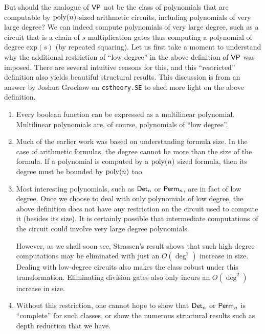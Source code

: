 But should the analogue of $\mathsf{VP}$ not be the class of polynomials that are computable by $\operatorname{poly}(n)$-sized arithmetic
circuits, including polynomials of very large degree?
We can indeed compute polynomials of very large degree, such as a circuit that is a chain of $s$ multiplication gates thus computing a polynomial of degree $\mathrm{exp}(s)$ (by repeated squaring). 
Let us first take a moment to understand why the additional restriction of ``low-degree'' in the above definition of $\mathsf{VP}$ was imposed. 
There are several intuitive reasons for this, and this ``restricted'' definition also yields beautiful structural results. 
This discussion is from an answer by Joshua Grochow on \texttt{cstheory.SE} \cite{gro:SE} to shed more light on the above definition. 

\begin{enumerate}

\item Every boolean function can be expressed as a multilinear polynomial. 
Multilinear polynomials are, of course, polynomials of ``low degree''. 

\item Much of the earlier work was based on understanding formula size. 
In the case of arithmetic formulas, the degree cannot be more than the size of the formula. 
If a polynomial is computed by a $\operatorname{poly}(n)$ sized formula, then its degree must be bounded by $\operatorname{poly}(n)$ too. 

\item Most interesting polynomials, such as $\operatorname{\mathsf{Det}}_n$ or $\operatorname{\mathsf{Perm}}_n$, are in fact of low degree. 
Once we choose to deal with only polynomials of low degree, the above definition does not have any restriction on the circuit used to compute it (besides its size). 
It is certainly possible that intermediate computations of the circuit could involve very large degree polynomials. 

However, as we shall soon see, Strassen's result shows that such high degree computations may be eliminated with just an $O(\deg^2)$ increase in size. 
Dealing with low-degree circuits also makes the class robust under this transformation. 
Eliminating division gates also only incurs an $O(\deg^2)$ increase in size. 

\item Without this restriction, one cannot hope to show that $\operatorname{\mathsf{Det}}_n$ or $\operatorname{\mathsf{Perm}}_n$ is ``complete'' for such classes, or
show the numerous structural results such as depth reduction that we have. 

\end{enumerate}

